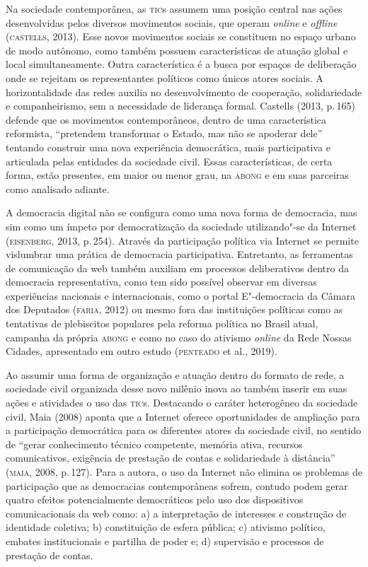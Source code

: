 Na sociedade contemporânea, as \textsc{tic}s assumem uma posição central nas
ações desenvolvidas pelos diversos movimentos sociais, que operam
\emph{online} e \emph{offline} (\textsc{castells}, 2013). Esse novos movimentos sociais se
constituem no espaço urbano de modo autônomo, como também possuem
características de atuação global e local simultaneamente. Outra
característica é a busca por espaços de deliberação onde se rejeitam os
representantes políticos como únicos atores sociais. A horizontalidade
das redes auxilia no desenvolvimento de cooperação, solidariedade e
companheirismo, sem a necessidade de liderança formal. Castells (2013,
p.\,165) defende que os movimentos contemporâneos, dentro de uma
característica reformista, ``pretendem transformar o Estado, mas não se
apoderar dele'' tentando construir uma nova experiência democrática, mais
participativa e articulada pelas entidades da sociedade civil. Essas
características, de certa forma, estão presentes, em maior ou menor
grau, na \textsc{abong} e em suas parceiras como analisado adiante.

A democracia digital não se configura como uma nova forma de democracia,
mas sim como um ímpeto por democratização da sociedade utilizando"-se da
Internet (\textsc{eisenberg}, 2013, p.\,254). Através da participação política via
Internet se permite vislumbrar uma prática de democracia participativa.
Entretanto, as ferramentas de comunicação da web também auxiliam em
processos deliberativos dentro da democracia representativa, como tem
sido possível observar em diversas experiências nacionais e
internacionais, como o portal E"-democracia da Câmara dos Deputados
(\textsc{faria}, 2012) ou mesmo fora das instituições políticas como as
tentativas de plebiscitos populares pela reforma política no Brasil
atual, campanha da própria \textsc{abong} e como no caso do ativismo \emph{online} da
Rede Nossas Cidades, apresentado em outro estudo (\textsc{penteado} et al.,
2019).

Ao assumir uma forma de organização e atuação dentro do formato de rede,
a sociedade civil organizada desse novo milênio inova ao também inserir
em suas ações e atividades o uso das \textsc{tic}s. Destacando o caráter
heterogêneo da sociedade civil, Maia (2008) aponta que a Internet
oferece oportunidades de ampliação para a participação democrática para
os diferentes atores da sociedade civil, no sentido de ``gerar
conhecimento técnico competente, memória ativa, recursos comunicativos,
exigência de prestação de contas e solidariedade à distância'' (\textsc{maia},
2008, p.\,127). Para a autora, o uso da Internet não elimina os problemas
de participação que as democracias contemporâneas sofrem, contudo podem
gerar quatro efeitos potencialmente democráticos pelo uso dos
dispositivos comunicacionais da web como: a) a interpretação de
interesses e construção de identidade coletiva; b) constituição de
esfera pública; c) ativismo político, embates institucionais e partilha
de poder e; d) supervisão e processos de prestação de contas.

